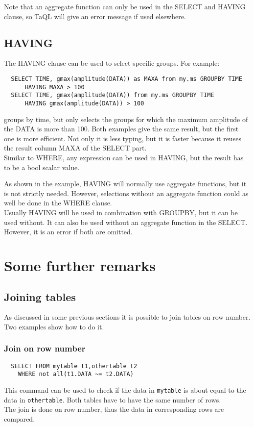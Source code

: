 Note that an aggregate function can only be used in the SELECT and
HAVING clause, so TaQL will give an error message if used elsewhere.

\subsection{HAVING}
The HAVING clause can be used to select specific groups. For example:
\begin{verbatim}
  SELECT TIME, gmax(amplitude(DATA)) as MAXA from my.ms GROUPBY TIME
      HAVING MAXA > 100
  SELECT TIME, gmax(amplitude(DATA)) from my.ms GROUPBY TIME
      HAVING gmax(amplitude(DATA)) > 100
\end{verbatim}
groups by time, but only selects the groups for which the maximum
amplitude of the DATA is more than 100.
Both examples give the same result, but the first one is more
efficient. Not only it is less typing,  but it is faster because it
reuses the result column MAXA of the SELECT part.
\\Similar to WHERE, any expression can be used in HAVING, but the
result has to be a bool scalar value.

As shown in the example, HAVING
will normally use aggregate functions, but it is not strictly
needed. However, selections without an aggregate function could
as well be done in the WHERE clause.
\\Usually HAVING will be used in combination with GROUPBY, but it can
be used without. It can also be used without an aggregate function in
the SELECT. However, it is an error if both are omitted.


\section{Some further remarks}
\subsection{\label{TAQL:JOIN}Joining tables}
As discussed in some previous sections it is possible to join tables
on row number. Two examples show how to do it.

\subsubsection{Join on row number}
\begin{verbatim}
  SELECT FROM mytable t1,othertable t2
    WHERE not all(t1.DATA ~= t2.DATA)
\end{verbatim}
This command can be used to check if the data in \texttt{mytable} is about
equal to the data in \texttt{othertable}. Both tables have to have the
same number of rows.
\\The join is done on row number, thus the data in 
corresponding rows are compared.


